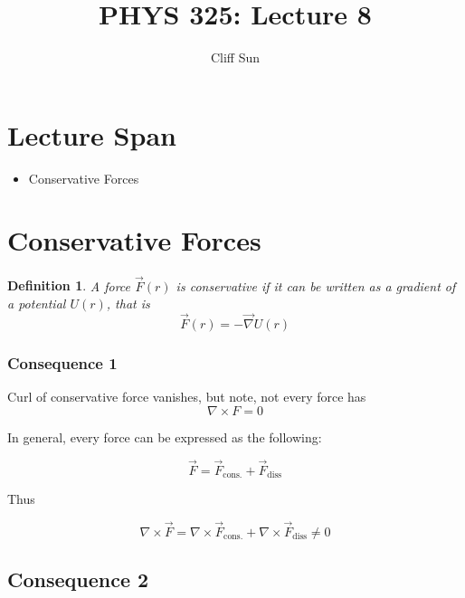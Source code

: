 \documentclass{article}
\title{PHYS 325: Lecture 8}
\author{Cliff Sun}
\newtheorem{definition}[theorem]{Definition}
\newtheorem{one minute paper}[theorem]{One Minute Paper}
\begin{document}
\maketitle

\section*{Lecture Span}
\begin{itemize}
    \item Conservative Forces
\end{itemize}

\section*{Conservative Forces}

\begin{definition}
    A force $\vec{F}(r)$ is conservative if it can be written as a gradient of a potential $U(r)$, that is 
    \begin{equation}
        \vec{F}(r) = -\vec{\nabla}U(r)
    \end{equation}
\end{definition}

\subsubsection*{Consequence 1}

Curl of conservative force vanishes, but note, not every force has
\begin{equation}
    \nabla \times F = 0
\end{equation}

In general, every force can be expressed as the following:

\begin{equation}
    \vec{F} = \vec{F}_{\text{cons.}} + \vec{F}_{\text{diss}}
\end{equation}

Thus

\begin{equation}
    \nabla \times \vec{F} = \nabla \times \vec{F}_{\text{cons.}} + \nabla \times \vec{F}_{\text{diss}} \neq 0
\end{equation}

\subsection*{Consequence 2}
\end{document}
